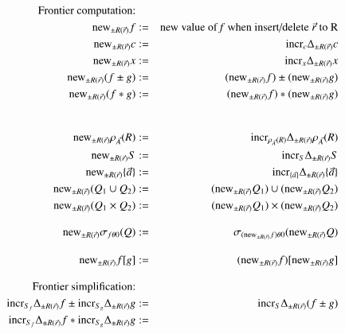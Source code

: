 \documentclass{article}
\begin{document}
%
%
\begin{figure*}
\begin{eqnarray}
\mbox{Frontier computation:} && \nonumber
\\
\nonumber\algnew_{\pm R(\vec{r})} f &:=& \mbox{new value of \emph{f} when insert/delete } \vec{r} \mbox{ to R}\\
\label{eq:new1}
\algnew_{\pm R(\vec{r})} c       &:=& \algincr_{c} \Delta_{\pm R(\vec{r})} c \\
\label{eq:new2}
\algnew_{\pm R(\vec{r})} x       &:=& \algincr_{x} \Delta_{\pm R(\vec{r})} x \\
\label{eq:new3}
\algnew_{\pm R(\vec{r})} (f \pm g) &:=&
(\algnew_{\pm R(\vec{r})} f) \pm (\algnew_{\pm R(\vec{r})} g) \\
\label{eq:new4}
\algnew_{\pm R(\vec{r})} (f * g) &:=&
(\algnew_{\pm R(\vec{r})} f) * (\algnew_{\pm R(\vec{r})} g)\\
%
%
\nonumber
\\[2ex]
\label{eq:newr1}
\algnew_{\pm R(\vec{r})} \rho_{\vec{A}}(R) &:=&
   \algincr_{\rho_{\vec{A}}(R)} \Delta_{\pm R(\vec{r})} \rho_{\vec{A}}(R)
\\
\label{eq:newr2}
\algnew_{\pm R(\vec{r})} S &:=& \algincr_{S} \Delta_{\pm R(\vec{r})} S
\\
\label{eq:newr3}
\algnew_{\pm R(\vec{r})} \{ \vec{a} \} &:=&
\algincr_{\{ \vec{a} \}} \Delta_{\pm R(\vec{r})} \{ \vec{a} \}
\\
\label{eq:newr4}
\algnew_{\pm R(\vec{r})} (Q_1 \cup Q_2) &:=&
   (\algnew_{\pm R(\vec{r})} Q_1) \cup (\algnew_{\pm R(\vec{r})} Q_2)
\\
\label{eq:newr5}
\algnew_{\pm R(\vec{r})} (Q_1 \times Q_2) &:=&
   (\algnew_{\pm R(\vec{r})} Q_1) \times (\algnew_{\pm R(\vec{r})} Q_2)
%
%
\\[2ex]
\label{eq:newr6}
\algnew_{\pm R(\vec{r})} \sigma_{f \theta 0}(Q) &:=&
   \sigma_{(\algnew_{\pm R(\vec{r})} f) \theta 0}(\algnew_{\pm R(\vec{r})} Q)
%
%
\\[2ex]
\label{eq:newr7}
\algnew_{\pm R(\vec{r})} f[g] & := &
   (\algnew_{\pm R(\vec{r})} f)[\algnew_{\pm R(\vec{r})} g]
%
%
%
\\[2ex]
\mbox{Frontier simplification:} && \nonumber
\\
\label{eq:fs1}
\algincr_{S_f} \Delta_{\pm R(\vec{r})} f
    \pm \algincr_{S_g} \Delta_{\pm R(\vec{r})} g &:=&
\algincr_{S} \Delta_{\pm R(\vec{r})} (f \pm g)
\\
\label{eq:fs2}
\algincr_{S_f} \Delta_{\pm R(\vec{r})} f * \algincr_{S_g} \Delta_{\pm R(\vec{r})} g &:=&

\end{eqnarray}
\end{figure*}
\end{document}

